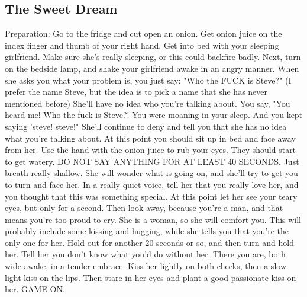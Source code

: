 \documentclass[a4paper]{article}
\begin{document}
\subsection{The Sweet Dream}
Preparation: Go to the fridge and cut open an onion. Get onion juice on the index finger and thumb of your right hand.
Get into bed with your sleeping girlfriend. Make sure she's really sleeping, or this could backfire badly.
Next, turn on the bedside lamp, and shake your girlfriend awake in an angry manner.
When she asks you what your problem is, you just say: "Who the FUCK is Steve?" (I prefer the name Steve, but the idea is to pick a name that she has never mentioned before)
She'll have no idea who you're talking about.
You say, "You heard me! Who the fuck is Steve?! You were moaning in your sleep. And you kept saying 'steve! steve!"
She'll continue to deny and tell you that she has no idea what you're talking about.
At this point you should sit up in bed and face away from her. Use the hand with the onion juice to rub your eyes. They should start to get watery. DO NOT SAY ANYTHING FOR AT LEAST 40 SECONDS. Just breath really shallow.
She will wonder what is going on, and she'll try to get you to turn and face her.
In a really quiet voice, tell her that you really love her, and you thought that this was something special.
At this point let her see your teary eyes, but only for a second. Then look away, because you're a man, and that means you're too proud to cry.
She is a woman, so she will comfort you. This will probably include some kissing and hugging, while she tells you that you're the only one for her.
Hold out for another 20 seconds or so, and then turn and hold her. Tell her you don't know what you'd do without her.
There you are, both wide awake, in a tender embrace. Kiss her lightly on both cheeks, then a slow light kiss on the lips. Then stare in her eyes and plant a good passionate kiss on her.
GAME ON.
\end{document}
